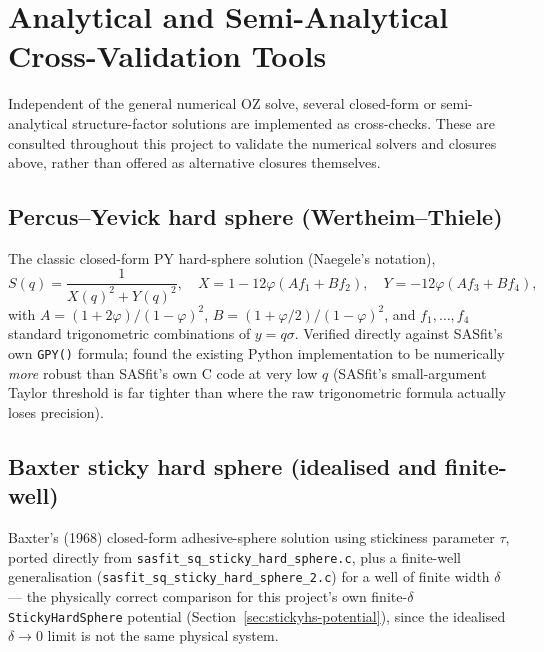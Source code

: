 \documentclass[11pt,a4paper]{article}
\newcommand{\code}[1]{\texttt{#1}}
\begin{document}
\clearpage
\section{Analytical and Semi-Analytical Cross-Validation Tools}
\label{sec:analytical}

Independent of the general numerical OZ solve, several closed-form or
semi-analytical structure-factor solutions are implemented as cross-checks.
These are consulted throughout this project to validate the numerical solvers
and closures above, rather than offered as alternative closures themselves.

\subsection{Percus--Yevick hard sphere (Wertheim--Thiele)}
The classic closed-form PY hard-sphere solution (Naegele's notation),
\begin{equation}
  S(q) = \frac{1}{X(q)^2+Y(q)^2}, \quad
  X = 1-12\varphi(Af_1+Bf_2), \quad Y = -12\varphi(Af_3+Bf_4),
\end{equation}
with $A=(1+2\varphi)/(1-\varphi)^2$, $B=(1+\varphi/2)/(1-\varphi)^2$, and
$f_1,\dots,f_4$ standard trigonometric combinations of $y=q\sigma$. Verified
directly against SASfit's own \code{GPY()} formula; found the existing Python
implementation to be numerically \emph{more} robust than SASfit's own C code
at very low $q$ (SASfit's small-argument Taylor threshold is far tighter than
where the raw trigonometric formula actually loses precision).

\subsection{Baxter sticky hard sphere (idealised and finite-well)}
Baxter's (1968) closed-form adhesive-sphere solution using stickiness
parameter $\tau$, ported directly from
\code{sasfit\_sq\_sticky\_hard\_sphere.c}, plus a finite-well generalisation
(\code{sasfit\_sq\_sticky\_hard\_sphere\_2.c}) for a well of finite width
$\delta$ --- the physically correct comparison for this project's own
finite-$\delta$ \code{StickyHardSphere} potential (Section~\ref{sec:stickyhs-potential}),
since the idealised $\delta\to0$ limit is not the same physical system.
\end{document}
